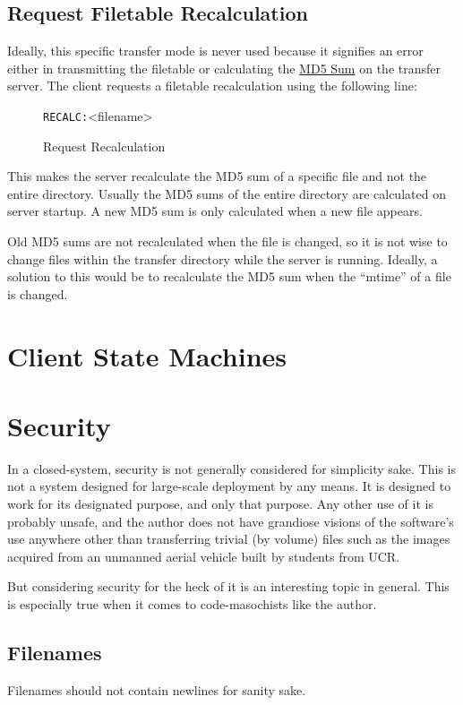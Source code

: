 \documentclass[12pt]{article}
\begin{document}
\subsection{Request Filetable Recalculation}
\label{sec:recalculate_MD5}
Ideally, this specific transfer mode is never used because it signifies an
error either in transmitting the filetable or calculating the
\href{http://en.wikipedia.org/wiki/Md5sum}{MD5 Sum} on the transfer server.
The client requests a filetable recalculation using the following line:
\begin{figure}[H]
	\centering
	\verb+RECALC:+\textvisiblespace <filename>\carriagereturn\carriagereturn
	\caption{Request Recalculation}
	\label{fig:recalculate_request}
\end{figure}

This makes the server recalculate the MD5 sum of a specific file and not the
entire directory.  Usually the MD5 sums of the entire directory are calculated
on server startup.  A new MD5 sum is only calculated when a new file appears.

Old MD5 sums are not recalculated when the file is changed, so it is not wise
to change files within the transfer directory while the server is running.
Ideally, a solution to this would be to recalculate the MD5 sum when the
``mtime'' of a file is changed.

\section{Client State Machines}

\section{Security}
\label{sec:security}
In a closed-system, security is not generally considered for simplicity sake.
This is not a system designed for large-scale deployment by any means.
It is designed to work for its designated purpose, and only that purpose.
Any other use of it is probably unsafe, and the author does not have grandiose
visions of the software's use anywhere other than transferring trivial (by
volume) files such as the images acquired from an unmanned aerial vehicle
built by students from UCR.

But considering security for the heck of it is an interesting topic in general.
This is especially true when it comes to code-masochists like the author.

\subsection{Filenames}
\label{sec:filenames}
Filenames should not contain newlines for sanity sake.
\end{document}
